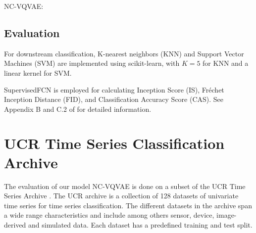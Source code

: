 \documentclass[../../thesis.tex]{subfiles}
\begin{document}
NC-VQVAE: 

\subsection{Evaluation}
For downstream classification, K-nearest neighbors (KNN) and Support Vector Machines (SVM) are implemented using scikit-learn, with $K=5$ for KNN and a linear kernel for SVM. \newline

SupervisedFCN is employed for calculating Inception Score (IS), Fréchet Inception Distance (FID), and Classification Accuracy Score (CAS). See Appendix B and C.2 of \cite{VQVAE} for detailed information.



\section{UCR Time Series Classification Archive}
The evaluation of our model NC-VQVAE is done on a subset of the UCR Time Series Archive \cite{UCRArchive2018}. The UCR archive is a collection of 128 datasets of univariate time series for time series classification. The different datasets in the archive span a wide range characteristics and include among others sensor, device, image-derived and simulated data. Each dataset has a predefined training and test split.\newline
\end{document}
